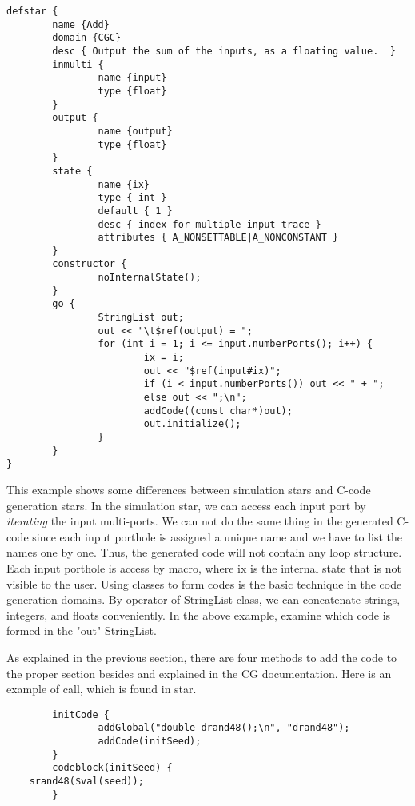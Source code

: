 \begin{verbatim}
defstar {
        name {Add}
        domain {CGC}
        desc { Output the sum of the inputs, as a floating value.  }
        inmulti {
                name {input}
                type {float}
        }
        output {
                name {output}
                type {float}
        }
        state {
                name {ix}
                type { int }
                default { 1 }
                desc { index for multiple input trace }
                attributes { A_NONSETTABLE|A_NONCONSTANT }
        }
        constructor {
                noInternalState();
        }
        go {
                StringList out;
                out << "\t$ref(output) = ";
                for (int i = 1; i <= input.numberPorts(); i++) {
                        ix = i;
                        out << "$ref(input#ix)";
                        if (i < input.numberPorts()) out << " + ";
                        else out << ";\n";
                        addCode((const char*)out);
                        out.initialize();
                }
        }
}
\end{verbatim}

This example shows some differences between simulation stars and 
C-code generation stars. In the simulation star, we can access
each input port by \emph{iterating} the input multi-ports. We can not
do the same thing in the generated C-code since each input porthole
is assigned a unique name and we have to list the names one by one.
Thus, the generated code will not contain any loop structure.
Each input porthole is access by 
macro, where ix is the internal state that is not visible to the
user. Using 
classes to form codes is the basic technique in the code generation domains.
By 
operator of StringList class, we can concatenate strings, integers,
and floats conveniently. In the above example, examine
which code is formed in the "out" StringList.

As explained in the previous section, there are four methods to add
the code to the proper section besides 
and 
explained in the CG documentation.
Here is an example of 
call, which is found in 
star.

\begin{verbatim}
        initCode {
                addGlobal("double drand48();\n", "drand48");
                addCode(initSeed);
        }
        codeblock(initSeed) {
    srand48($val(seed));
        }
\end{verbatim}

